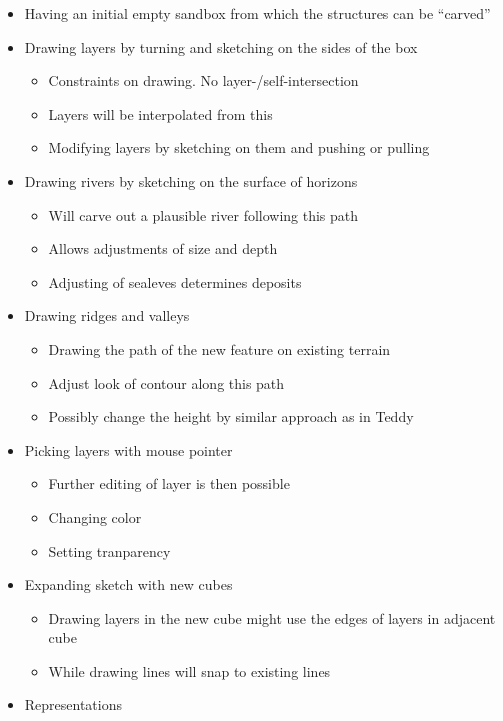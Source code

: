 \documentclass[12pt,a4paper]{article}
\begin{document}
\begin{itemize}
 \item Having an initial empty sandbox from which the structures can be ``carved''
 \item Drawing layers by turning and sketching on the sides of the box
    \begin{itemize}
     \item Constraints on drawing. No layer-/self-intersection
     \item Layers will be interpolated from this
     \item Modifying layers by sketching on them and pushing or pulling
    \end{itemize}
 \item Drawing rivers by sketching on the surface of horizons
    \begin{itemize}
     \item Will carve out a plausible river following this path
     \item Allows adjustments of size and depth
     \item Adjusting of sealeves determines deposits
    \end{itemize}
  \item Drawing ridges and valleys
    \begin{itemize}
     \item Drawing the path of the new feature on existing terrain
     \item Adjust look of contour along this path
     \item Possibly change the height by similar approach as in Teddy
    \end{itemize}
\item Picking layers with mouse pointer
    \begin{itemize}
     \item Further editing of layer is then possible
     \item Changing color
     \item Setting tranparency
    \end{itemize}
\item Expanding sketch with new cubes
    \begin{itemize}
     \item Drawing layers in the new cube might use the edges of layers in adjacent cube
     \item While drawing lines will snap to existing lines
    \end{itemize}
\item Representations

\end{itemize}
\end{document}
